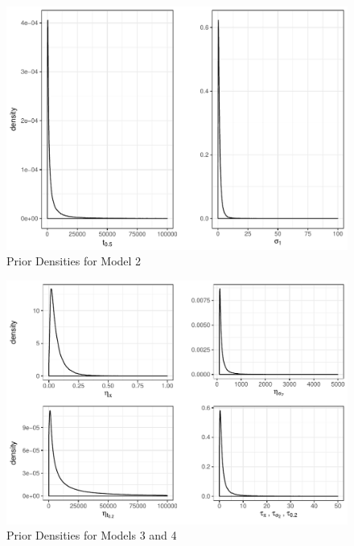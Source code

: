\documentclass[12pt]{article}
\begin{document}
\begin{figure}[H]
\center
\includegraphics[width=.7\textwidth]{priorsmod2.pdf}
\caption{Prior Densities for Model 2}
\end{figure}

\begin{figure}[H]
\center
\includegraphics[width=\textwidth]{priorsmod4.pdf}
\caption{Prior Densities for Models 3 and 4}
\end{figure}
\end{document}
